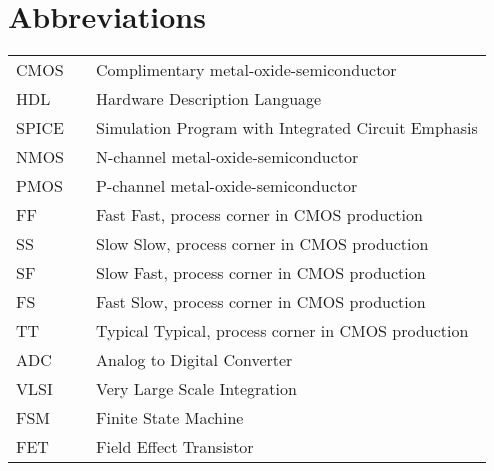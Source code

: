 \section*{Abbreviations}

\begin{tabular}{l c l}
CMOS &  & Complimentary metal-oxide-semiconductor \\
HDL &  & Hardware Description Language \\
SPICE & & Simulation Program with Integrated Circuit Emphasis \\
NMOS & & N-channel metal-oxide-semiconductor \\
PMOS & & P-channel metal-oxide-semiconductor \\
FF & & Fast Fast, process corner in CMOS production\\
SS & & Slow Slow, process corner in CMOS production\\
SF & & Slow Fast, process corner in CMOS production\\
FS & & Fast Slow, process corner in CMOS production\\
TT & & Typical Typical, process corner in CMOS production\\
ADC & & Analog to Digital Converter\\
VLSI & & Very Large Scale Integration\\
FSM & & Finite State Machine\\
FET &  & Field Effect Transistor \\
\end{tabular}

\clearpage